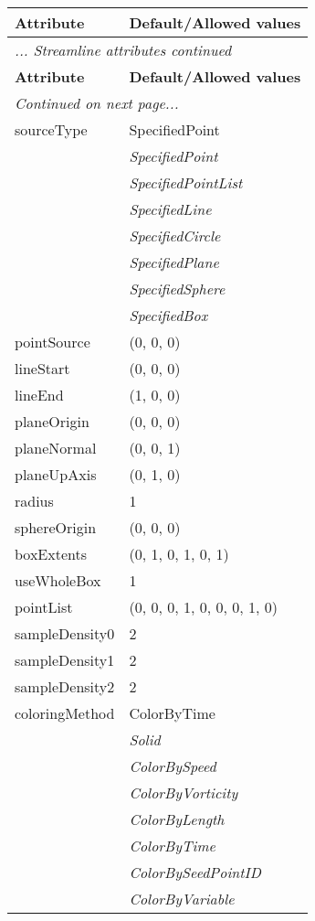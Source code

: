 \documentclass[10pt,a4paper]{report}
\begin{document}
\begin{longtable}{ll}
{\bf Attribute} & {\bf Default/Allowed values} \\
\hline \hline
\endfirsthead
\multicolumn{2}{l}{{\it ... Streamline attributes continued}} \\
{\bf Attribute} & {\bf Default/Allowed values} \\
\hline \hline
\endhead
\hline
\multicolumn{2}{l}{{\it Continued on next page...}} \\
\endfoot
\hline
\endlastfoot

sourceType  &  SpecifiedPoint   \\
 & {\it  SpecifiedPoint} \\
 & {\it  SpecifiedPointList} \\
 & {\it  SpecifiedLine} \\
 & {\it  SpecifiedCircle} \\
 & {\it  SpecifiedPlane} \\
 & {\it  SpecifiedSphere} \\
 & {\it  SpecifiedBox} \\
pointSource  &  (0, 0, 0) \\
lineStart  &  (0, 0, 0) \\
lineEnd  &  (1, 0, 0) \\
planeOrigin  &  (0, 0, 0) \\
planeNormal  &  (0, 0, 1) \\
planeUpAxis  &  (0, 1, 0) \\
radius  &  1 \\
sphereOrigin  &  (0, 0, 0) \\
boxExtents  &  (0, 1, 0, 1, 0, 1) \\
useWholeBox  &  1 \\
pointList  &  (0, 0, 0, 1, 0, 0, 0, 1, 0) \\
sampleDensity0  &  2 \\
sampleDensity1  &  2 \\
sampleDensity2  &  2 \\
coloringMethod  &  ColorByTime   \\
 & {\it  Solid} \\
 & {\it  ColorBySpeed} \\
 & {\it  ColorByVorticity} \\
 & {\it  ColorByLength} \\
 & {\it  ColorByTime} \\
 & {\it  ColorBySeedPointID} \\
 & {\it  ColorByVariable} \\

\end{longtable}
\end{document}
